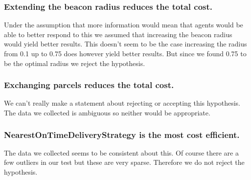 \documentclass[../main.tex]{subfiles}
\begin{document}
\subsubsection{Extending the beacon radius reduces the total cost.}
Under the assumption that more information would mean that agents would be able to better respond to this we assumed that increasing the beacon radius would yield better results.
This doesn't seem to be the case increasing the radius from 0.1 up to 0.75 does however yield better results.
But since we found 0.75 to be the optimal radius we reject the hypothesis.

\subsubsection{Exchanging parcels reduces the total cost.}
We can't really make a statement about rejecting or accepting this hypothesis.
The data we collected is ambiguous so neither would be appropriate.

\subsubsection{NearestOnTimeDeliveryStrategy is the most cost efficient.}
The data we collected seems to be consistent about this.
Of course there are a few outliers in our test but these are very sparse.
Therefore we do not reject the hypothesis.
\end{document}
